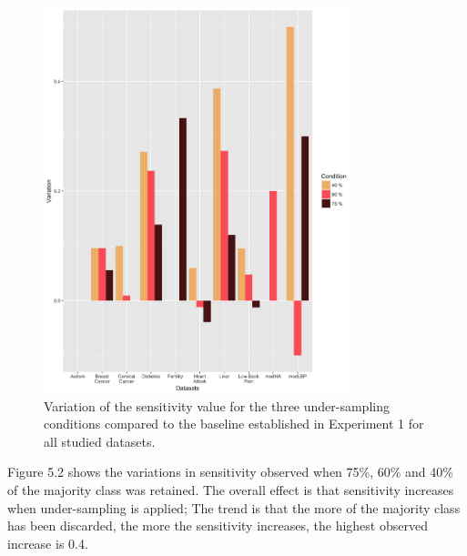 \begin{figure}[!htbp]
    \centering
    \includegraphics[width=0.8\textwidth]{ThesisTemplate/usingLatex/chapter5Images/SensiVariationUnderBySets.png}
    \caption{Variation of the sensitivity value for the three under-sampling conditions compared to the baseline established in Experiment 1 for all studied datasets.}
    \label{fig:sensiVar}
\end{figure}
Figure 5.2 shows the variations in sensitivity observed when   75\%, 60\% and 40\% of the majority class was retained. The overall effect is that sensitivity increases when under-sampling is applied; The trend is that the more of the majority class has been discarded, the more the sensitivity increases, the highest observed increase is 0.4.\newline



